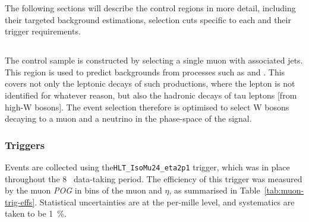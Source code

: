 The following sections will describe the control regions in more detail,
including their targeted background estimations, selection cuts specific to each
and their trigger requirements.

\subsection{\mj}

The \mj control sample is constructed by selecting a single muon with associated 
jets. This region is used to predict backgrounds from processes such as \wj and
\ttj. This covers not only the leptonic decays of such productions, where the 
lepton is not identified for whatever reason, but also the hadronic decays of tau 
leptons [from high-\Pt W bosons]. The event selection therefore is optimised to 
select W bosons decaying to a muon and a neutrino in the phase-space of the 
signal.

\subsubsection{Triggers}
\label{sec:mujets_control_trigger}
Events are collected using the\verb!HLT_IsoMu24_eta2p1! trigger, which was in
place throughout the 8~\tev
data-taking period. The efficiency of this trigger was measured by the muon
\emph{POG} in bins of the muon \Pt and $\eta$, as summarised 
in Table~\ref{tab:muon-trig-effs}. Statistical uncertainties are at the
per-mille level, and systematics are taken to be 1~\%.

